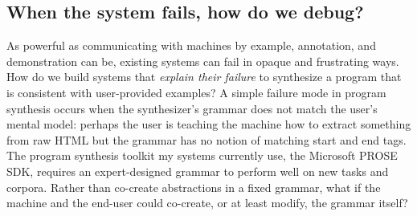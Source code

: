 \documentclass[justified]{tufte-handout}
\begin{document}



\subsection{When the system fails, how do we debug?}
As powerful as communicating with machines by example, annotation, and demonstration can be, existing systems can fail in opaque and frustrating ways. How do we build systems that \emph{explain their failure} to synthesize a program that is consistent with user-provided examples? A simple failure mode in program synthesis occurs when the synthesizer's grammar does not match the user's mental model: perhaps the user is teaching the machine how to extract something from raw HTML but the grammar has no notion of matching start and end tags. The program synthesis toolkit my systems currently use, the Microsoft PROSE SDK, requires an expert-designed grammar to perform well on new tasks and corpora. Rather than co-create abstractions in a fixed grammar, what if the machine and the end-user could co-create, or at least modify, the grammar itself? %



\newpage



\end{document}
